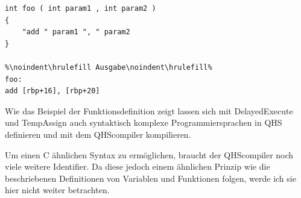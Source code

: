 \begin{lstlisting}[language=QHS, caption=Finale Definition einer Funktion in QHS]
int foo ( int param1 , int param2 )
{
    "add " param1 ", " param2
}

%\noindent\hrulefill Ausgabe\noindent\hrulefill%
foo:
add [rbp+16], [rbp+20]
\end{lstlisting}

Wie das Beispiel der Funktionsdefinition zeigt lassen sich mit DelayedExecute und TempAssign auch syntaktisch komplexe Programmiersprachen in QHS definieren und mit dem QHScompiler kompilieren.

Um einen C ähnlichen Syntax zu ermöglichen, braucht der QHScompiler noch viele weitere Identifier.
Da diese jedoch einem ähnlichen Prinzip wie die beschriebenen Definitionen von Variablen und Funktionen folgen, werde ich sie hier nicht weiter betrachten.


    






